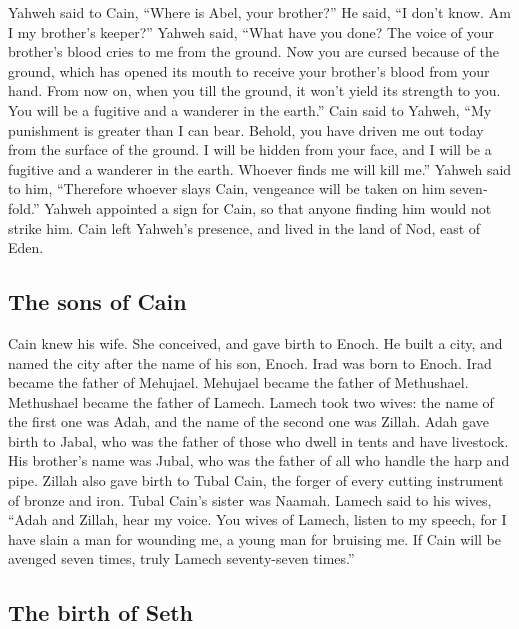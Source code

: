 \begin{paracol}{2}
\begin{otherlanguage}{english}
 Yahweh said to Cain, ``Where is Abel, your brother?'' He
said, ``I don't know. Am I my brother's keeper?''  Yahweh
said, ``What have you done? The voice of your brother's blood cries to
me from the ground.  Now you are cursed because of the
ground, which has opened its mouth to receive your brother's blood from
your hand.  From now on, when you till the ground, it
won't yield its strength to you. You will be a fugitive and a wanderer
in the earth.''  Cain said to Yahweh, ``My punishment is
greater than I can bear.  Behold, you have driven me out
today from the surface of the ground. I will be hidden from your face,
and I will be a fugitive and a wanderer in the earth. Whoever finds me
will kill me.''  Yahweh said to him, ``Therefore whoever
slays Cain, vengeance will be taken on him sevenfold.'' Yahweh appointed
a sign for Cain, so that anyone finding him would not strike him.
 Cain left Yahweh's presence, and lived in the land of
Nod, east of Eden.

\hypertarget{the-sons-of-cain}{%
\subsection{The sons of Cain}\label{the-sons-of-cain}}

 Cain knew his wife. She conceived, and gave birth to
Enoch. He built a city, and named the city after the name of his son,
Enoch.  Irad was born to Enoch. Irad became the father of
Mehujael. Mehujael became the father of Methushael. Methushael became
the father of Lamech.  Lamech took two wives: the name of
the first one was Adah, and the name of the second one was Zillah.
 Adah gave birth to Jabal, who was the father of those
who dwell in tents and have livestock.  His brother's
name was Jubal, who was the father of all who handle the harp and pipe.
 Zillah also gave birth to Tubal Cain, the forger of
every cutting instrument of bronze and iron. Tubal Cain's sister was
Naamah.  Lamech said to his wives, ``Adah and Zillah,
hear my voice. You wives of Lamech, listen to my speech, for I have
slain a man for wounding me, a young man for bruising me.
 If Cain will be avenged seven times, truly Lamech
seventy-seven times.''

\hypertarget{the-birth-of-seth}{%
\subsection{The birth of Seth}\label{the-birth-of-seth}}


\end{otherlanguage}
\end{paracol}
